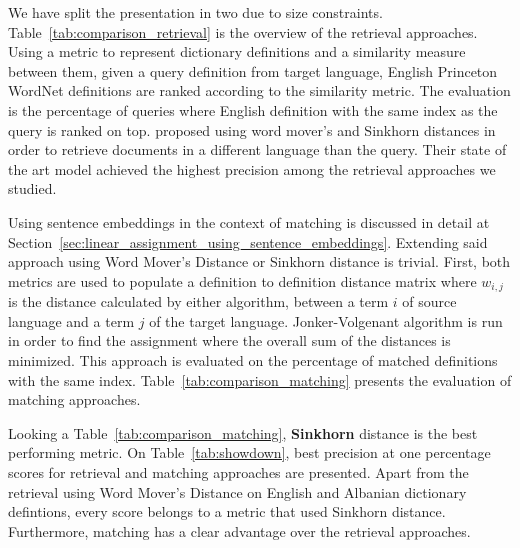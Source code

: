 We have split the presentation in two due to size constraints.
Table~\ref{tab:comparison_retrieval} is the overview of the retrieval approaches.
Using a metric to represent dictionary definitions and a similarity measure between them, given a query definition from target language, English Princeton WordNet definitions are ranked according to the similarity metric.
The evaluation is the percentage of queries where English definition with the same index as the query is ranked on top.
\textcite{balikasCrosslingual2018} proposed using word mover's and Sinkhorn distances in order to retrieve documents in a different language than the query.
Their state of the art model achieved the highest precision among the retrieval approaches we studied.

Using sentence embeddings in the context of matching is discussed in detail at Section~\ref{sec:linear_assignment_using_sentence_embeddings}.
Extending said approach using Word Mover's Distance or Sinkhorn distance is trivial.
First, both metrics are used to populate a definition to definition distance matrix where $w_{i,j}$ is the distance calculated by either algorithm, between a term $i$ of source language and a term $j$ of the target language.
Jonker-Volgenant algorithm is run in order to find the assignment where the overall sum of the distances is minimized.
This approach is evaluated on the percentage of matched definitions with the same index.
Table~\ref{tab:comparison_matching} presents the evaluation of matching approaches.

Looking a Table~\ref{tab:comparison_matching}, \textbf{Sinkhorn} distance is the best performing metric.
On Table~\ref{tab:showdown}, best precision at one percentage scores for retrieval and matching approaches are presented. Apart from the retrieval using Word Mover's Distance on English and Albanian dictionary defintions, every score belongs to a metric that used Sinkhorn distance.
Furthermore, matching has a clear advantage over the retrieval approaches.

